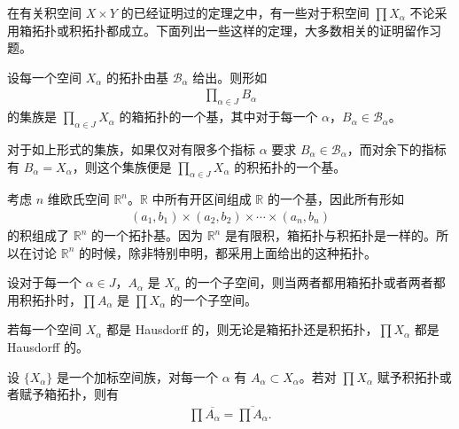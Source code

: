 \documentclass[../../main.tex]{subfiles}
\begin{document}
在有关积空间 $X \times Y$ 的已经证明过的定理之中，有一些对于积空间 $\prod X_{\alpha}$ 不论采用箱拓扑或积拓扑都成立。下面列出一些这样的定理，大多数相关的证明留作习题。

\begin{theorem}[由基构造箱拓扑与积拓扑]\label{theorem:ch02-基构造积}
设每一个空间 $X_{\alpha}$ 的拓扑由基 $\mathcal{B}_{\alpha}$ 给出。则形如
\begin{align*}
\prod_{\alpha \in J} B_{\alpha}
\end{align*}
的集族是 $\prod_{\alpha \in J} X_{\alpha}$ 的箱拓扑的一个基，其中对于每一个 $\alpha$，$B_{\alpha} \in \mathcal{B}_{\alpha}$。

对于如上形式的集族，如果仅对有限多个指标 $\alpha$ 要求 $B_{\alpha} \in \mathcal{B}_{\alpha}$，而对余下的指标有 $B_{\alpha} = X_{\alpha}$，则这个集族便是 $\prod_{\alpha \in J} X_{\alpha}$ 的积拓扑的一个基。
\end{theorem}

\begin{example}\label{example:ch02-Rn基}
考虑 $n$ 维欧氏空间 $\mathbb{R}^{n}$。$\mathbb{R}$ 中所有开区间组成 $\mathbb{R}$ 的一个基，因此所有形如
\begin{align*}
(a_{1}, b_{1}) \times (a_{2}, b_{2}) \times \cdots \times (a_{n}, b_{n})
\end{align*}
的积组成了 $\mathbb{R}^{n}$ 的一个拓扑基。因为 $\mathbb{R}^{n}$ 是有限积，箱拓扑与积拓扑是一样的。所以在讨论 $\mathbb{R}^{n}$ 的时候，除非特别申明，都采用上面给出的这种拓扑。
\end{example}

\begin{theorem}[积空间的子空间]\label{theorem:ch02-积子空间}
设对于每一个 $\alpha \in J$，$A_{\alpha}$ 是 $X_{\alpha}$ 的一个子空间，则当两者都用箱拓扑或者两者都用积拓扑时，$\prod A_{\alpha}$ 是 $\prod X_{\alpha}$ 的一个子空间。
\end{theorem}

\begin{theorem}\label{theorem:ch02-积Hausdorff}
若每一个空间 $X_{\alpha}$ 都是 Hausdorff 的，则无论是箱拓扑还是积拓扑，$\prod X_{\alpha}$ 都是 Hausdorff 的。
\end{theorem}

\begin{theorem}[积空间的闭包]\label{theorem:ch02-积闭包}
设 $\{X_{\alpha}\}$ 是一个加标空间族，对每一个 $\alpha$ 有 $A_{\alpha} \subset X_{\alpha}$。若对 $\prod X_{\alpha}$ 赋予积拓扑或者赋予箱拓扑，则有
\begin{align*}
\prod \overline{A_{\alpha}} = \overline{\prod A_{\alpha}}.
\end{align*}
\end{theorem}
\end{document}

